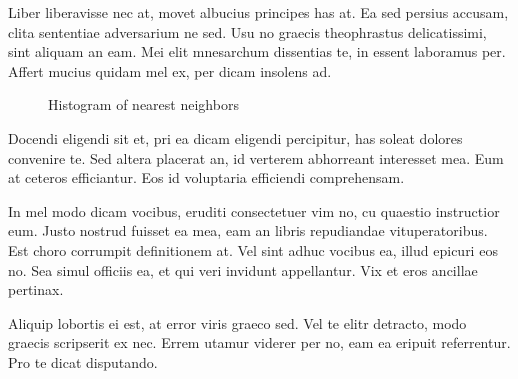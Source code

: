 Liber liberavisse nec at, movet albucius principes has at. Ea sed persius 
accusam, clita sententiae adversarium ne sed. Usu no graecis theophrastus 
delicatissimi, sint aliquam an eam. Mei elit mnesarchum dissentias te, in 
essent laboramus per. Affert mucius quidam mel ex, per dicam insolens ad.

\begin{figure}[htb]
  \begin{center}
  \end{center}
  \caption{Histogram of nearest neighbors}
  \label{CHAPTER2_FIG01}
\end{figure}

Docendi eligendi sit et, pri ea dicam eligendi percipitur, has soleat 
dolores convenire te. Sed altera placerat an, id verterem abhorreant 
interesset mea. Eum at ceteros efficiantur. Eos id voluptaria efficiendi 
comprehensam. 

In mel modo dicam vocibus, eruditi consectetuer vim no, cu quaestio 
instructior eum. Justo nostrud fuisset ea mea, eam an libris repudiandae 
vituperatoribus. Est choro corrumpit definitionem at. Vel sint adhuc vocibus 
ea, illud epicuri eos no. Sea simul officiis ea, et qui veri invidunt 
appellantur. Vix et eros ancillae pertinax.

Aliquip lobortis ei est, at error viris graeco sed. Vel te elitr detracto, 
modo graecis scripserit ex nec. Errem utamur viderer per no, eam ea eripuit 
referrentur. Pro te dicat disputando. 

